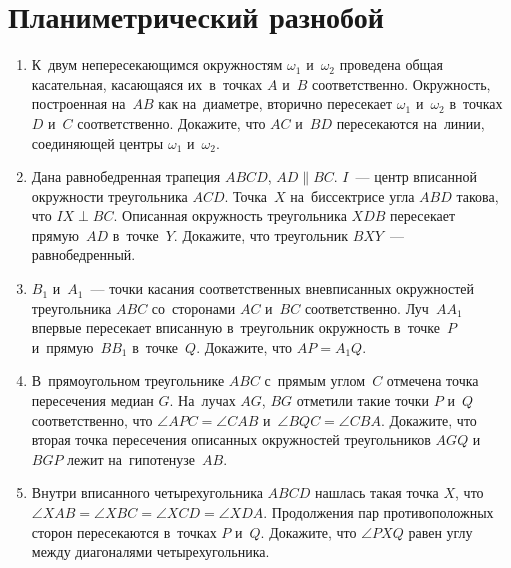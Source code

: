
\section*{Планиметрический разнобой}


\begin{enumerate}

\item
К~двум непересекающимся окружностям $\omega_1$ и~$\omega_2$ проведена общая
касательная, касающаяся их~в~точках $A$ и~$B$ соответственно.
Окружность, построенная на~$AB$ как на~диаметре, вторично пересекает
$\omega_1$ и~$\omega_2$ в~точках $D$ и~$C$ соответственно.
Докажите, что $AC$ и~$BD$ пересекаются на~линии, соединяющей центры
$\omega_1$ и~$\omega_2$.

\item
Дана равнобедренная трапеция $ABCD$, $AD \parallel BC$.
$I$~--- центр вписанной окружности треугольника $ACD$.
Точка~$X$ на~биссектрисе угла $ABD$ такова, что $IX \perp BC$.
Описанная окружность треугольника $XDB$ пересекает прямую~$AD$ в~точке~$Y$.
Докажите, что треугольник $BXY$~--- равнобедренный.

\item
$B_1$ и~$A_1$~--- точки касания соответственных вневписанных окружностей
треугольника $ABC$ со~сторонами $AC$ и~$BC$ соответственно.
Луч~$A A_1$ впервые пересекает вписанную в~треугольник окружность в~точке~$P$
и~прямую~$B B_1$ в~точке~$Q$.
Докажите, что $AP = A_1 Q$.

\item
В~прямоугольном треугольнике $ABC$ с~прямым углом~$C$ отмечена точка
пересечения медиан $G$.
На~лучах $AG$, $BG$ отметили такие точки $P$ и~$Q$ соответственно, что
$\angle APC = \angle CAB$ и~$\angle BQC = \angle CBA$.
Докажите, что вторая точка пересечения описанных окружностей треугольников
$AGQ$ и~$BGP$ лежит на~гипотенузе~$AB$.

\item
Внутри вписанного четырехугольника $ABCD$ нашлась такая точка $X$, что
$\angle XAB = \angle XBC = \angle XCD = \angle XDA$.
Продолжения пар противоположных сторон пересекаются в~точках $P$ и~$Q$.
Докажите, что $\angle PXQ$ равен углу между диагоналями четырехугольника.


\end{enumerate}
